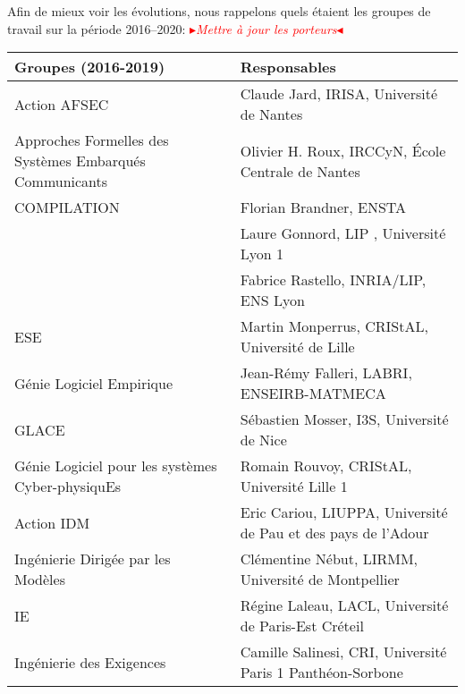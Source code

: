 \documentclass[11pt]{article}
\newcommand{\mynote}[3][black]{\textcolor{#1}{\fbox{\bfseries\sffamily\scriptsize{#2}}
{\small$\blacktriangleright$\textsf{\emph{#3}}$\blacktriangleleft$}}}
\newcommand{\TODO}[1]{\mynote[red]{TODO}{#1}}
\begin{document}
Afin de mieux voir les évolutions, nous rappelons quels étaient les groupes de travail sur
la période 2016--2020:
\TODO{Mettre à jour les porteurs}
{	\centering
		\begin{tabular}{|p{6cm}p{8.5cm}|}
\hline
\bf Groupes (2016-2019) & \bf Responsables \\
\hline
\hline
Action AFSEC & Claude Jard, IRISA, Université de Nantes\\
\footnotesize Approches Formelles des Systèmes Embarqués Communicants 
             &Olivier H. Roux, IRCCyN, École Centrale de Nantes \\
\hline
COMPILATION
& Florian Brandner, ENSTA\\
& Laure Gonnord, LIP , Université Lyon 1\\
& Fabrice Rastello, INRIA/LIP, ENS Lyon \\
\hline
ESE 
& Martin Monperrus, CRIStAL, Université de Lille\\
\footnotesize Génie Logiciel Empirique
& Jean-Rémy Falleri, LABRI, ENSEIRB-MATMECA\\
\hline


GLACE 
& Sébastien Mosser, I3S, Université de Nice\\
\footnotesize Génie Logiciel pour les systèmes Cyber-physiquEs
&Romain Rouvoy, CRIStAL, Université Lille 1\\
\hline
Action IDM
& Eric Cariou, LIUPPA, Université de Pau et des pays de l'Adour\\
\footnotesize Ingénierie Dirigée par les Modèles 
& Clémentine Nébut, LIRMM, Université de Montpellier\\
\hline
IE 
& Régine Laleau, LACL, Université de Paris-Est Créteil\\
\footnotesize Ingénierie des Exigences
& Camille Salinesi, CRI, Université Paris 1 Panthéon-Sorbone\\
\hline



\end{tabular}}
\end{document}
